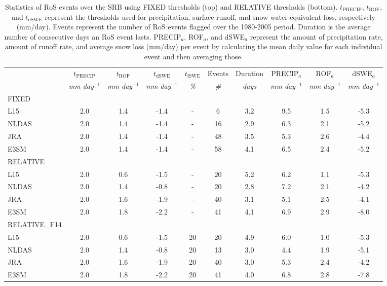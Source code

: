 \documentclass[nhess, manuscript]{copernicus}
\begin{document}
\begin{table}
\caption{Statistics of RoS events over the SRB using FIXED thresholds (top) and RELATIVE thresholds (bottom). $t_{\textrm{PRECIP}}$, $t_{\textrm{ROF}}$, and $t_{\textrm{dSWE}}$ represent the thresholds used for precipitation, surface runoff, and snow water equivalent loss, respectively (mm/day). Events represent the number of RoS events flagged over the 1980-2005 period. Duration is the average number of consecutive days an RoS event lasts. PRECIP$_{a}$, ROF$_{a}$, and dSWE$_{a}$ represent the amount of precipitation rate, amount of runoff rate, and average snow loss (mm/day) per event by calculating the mean daily value for each individual event and then averaging those.}
\begin{tabular}{lccccccccc}
      &  $t_{\textrm{PRECIP}}$ & $t_{\textrm{ROF}}$ & $t_{\textrm{dSWE}}$ & $t_{\textrm{fSWE}}$ & Events & Duration & PRECIP$_{a}$ & ROF$_{a}$ & dSWE$_{a}$ \\
      &  \textit{mm day$^{-1}$} & \textit{mm day$^{-1}$} & \textit{mm day$^{-1}$} & \textit{\%} & \textit{\#} & \textit{days} & \textit{mm day$^{-1}$} & \textit{mm day$^{-1}$} & \textit{mm day$^{-1}$} \\ \hline
FIXED &         &         &         &        &     &              &              &                &                \\ \hline
L15 & 2.0 & 1.4 & -1.4 & - & 6 & 3.2 & 9.5 & 1.5 & -5.3 \\
NLDAS & 2.0 & 1.4 & -1.4 & - & 16 & 2.9 & 6.3 & 2.1 & -5.2 \\
JRA & 2.0 & 1.4 & -1.4 & - & 48 & 3.5 & 5.3 & 2.6 & -4.4 \\
E3SM & 2.0 & 1.4 & -1.4 & - & 58 & 4.1 & 6.5 & 2.4 & -5.2 \\ \hline
RELATIVE      &         &         &         &        &     &              &              &                &                \\ \hline
L15 & 2.0 & 0.6 & -1.5 & - & 20 & 5.2 & 6.2 & 1.1 & -5.3 \\
NLDAS & 2.0 & 1.4 & -0.8 & - & 20 & 2.8 & 7.2 & 2.1 & -4.2 \\
JRA & 2.0 & 1.6 & -1.9 & - & 40 & 3.1 & 5.1 & 2.5 & -4.1 \\
E3SM & 2.0 & 1.8 & -2.2 & - & 41 & 4.1 & 6.9 & 2.9 & -8.0 \\ \hline
RELATIVE\_F14      &         &         &         &        &     &              &              &                &                \\ \hline
L15 & 2.0 & 0.6 & -1.5 & 20 & 20 & 4.9 & 6.0 & 1.0 & -5.3 \\
NLDAS & 2.0 & 1.4 & -0.8 & 20 & 13 & 3.0 & 4.4 & 1.9 & -5.1 \\
JRA & 2.0 & 1.6 & -1.9 & 20 & 40 & 3.0 & 5.3 & 2.4 & -4.2 \\
E3SM & 2.0 & 1.8 & -2.2 & 20 & 41 & 4.0 & 6.8 & 2.8 & -7.8 \\   \hline
\end{tabular}
\label{table:means}
\end{table}
\end{document}
